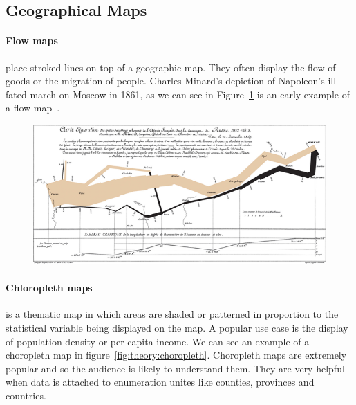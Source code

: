 \documentclass{article}
\begin{document}
\subsection{Geographical Maps}
\paragraph{Flow maps} place stroked lines on top of a geographic map.
They often display the flow of goods or the migration of people.
Charles Minard’s depiction of Napoleon’s ill-fated march on Moscow in 1861, as we can see in Figure~\ref{fig:theory:flow-map} is an early example of a flow map~\cite{Corbett2001}.
\begin{figure}[h]
  \centering
  \includegraphics[width=\textwidth]{images/theory/minard}
  \caption{%
  }\label{fig:theory:flow-map}
\end{figure}

\paragraph{Chloropleth maps} is a thematic map in which areas are shaded or patterned in proportion to the statistical variable being displayed on the map.
A popular use case is the display of population density or per-capita income.
We can see an example of a choropleth map in figure~\ref{fig:theory:choropleth}.
Choropleth maps are extremely popular and so the audience is likely to understand them.
They are very helpful when data is attached to enumeration unites like counties, provinces and countries.
\end{document}
